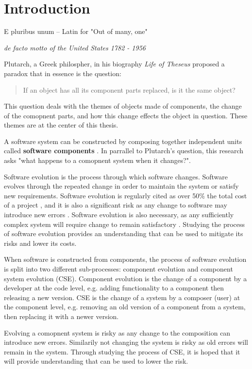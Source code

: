 \chapter{Introduction}
\label{introduction}
\epigraph{E pluribus unum -- Latin for "Out of many, one"}
{\textit{de facto motto of the United States 1782 - 1956}}
Plutarch, a Greek philospher, in his biography \textit{Life of Theseus} 
proposed a paradox that in essence is the question:
\begin{quote}
If an object has all its component parts replaced, is it the same object?
\end{quote}
This question deals with the themes of objects made of components, the change of the comopnent parts,
and how this change effects the object in question.
These themes are at the center of this thesis.

A software system can be constructed by composing together independent units called \textbf{software components} \citep{Szyperski2002}.
In parrallel to Plutarch's question, this research asks "what happens to a comopnent system when it changes?".

Software evolution is the process through which software changes.
Software evolves through the repeated change in order to maintain the system or satisfy new requirements.
Software evolution is regularly cited as over 50\% the total cost of a project \citep{Grubb2003},
and it is also a significant risk as any change to software may introduce new errors \citep{Brooks1975}.
Software evolution is also necessary, as any sufficiently complex system will require change to remain satisfactory \citep{lehman1980}. 
Studying the process of software evolution provides an understanding 
that can be used to mitigate its risks and lower its costs.

When software is constructed from components,
the process of software evolution is split into two different sub-processes:
component evolution and component system evolution (CSE).
Component evolution is the change of a component by a developer at the code level,
e.g. adding functionality to a component then releasing a new version.  
CSE is the change of a system by a composer (user) at the component level,
e.g. removing an old version of a component from a system, then replacing it with a newer version.

Evolving a comopnent system is risky as any change to the composition can introduce new errors.
Similarily not changing the system is risky as old errors will remain in the system.
Through studying the process of CSE, it is hoped that it will provide understanding that can be used to lower the risk.


